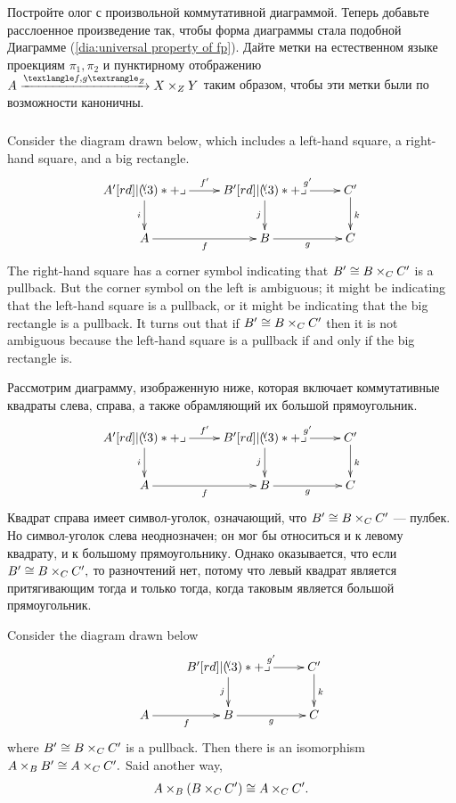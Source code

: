 \documentclass[../main/CT4S-EN-RU]{subfiles}
\begin{document}
\begin{exerciseRUS}
Постройте олог с произвольной коммутативной диаграммой. Теперь добавьте расслоенное произведение так, чтобы форма диаграммы стала подобной Диаграмме (\ref{dia:universal property of fp}). Дайте метки на естественном языке проекциям $\pi_1,\pi_2$ и пунктирному отображению $A\To{\pb{f}{g}{Z}}X\times_ZY$ таким образом, чтобы эти метки были по возможности каноничны.
\end{exerciseRUS}


\subsubsection{}

\begin{blockENG}
Consider the diagram drawn below, which includes a left-hand square, a right-hand square, and a big rectangle.
$$
\xymatrix{
A'\ar[r]^{f'}\ar[d]_i\ullimit&B'\ar[r]^{g'}\ar[d]_j\ullimit&C'\ar[d]^k\\
A\ar[r]_f&B\ar[r]_g&C}
$$
The right-hand square has a corner symbol indicating that $B'\cong B\times_CC'$ is a pullback. But the corner symbol on the left is ambiguous; it might be indicating that the left-hand square is a pullback, or it might be indicating that the big rectangle is a pullback. It turns out that if $B'\cong B\times_CC'$ then it is not ambiguous because the left-hand square is a pullback if and only if the big rectangle is.
\end{blockENG}

\begin{blockRUS}
Рассмотрим диаграмму, изображенную ниже, которая включает коммутативные квадраты слева, справа, а также обрамляющий их большой прямоугольник.
$$
\xymatrix{
A'\ar[r]^{f'}\ar[d]_i\ullimit&B'\ar[r]^{g'}\ar[d]_j\ullimit&C'\ar[d]^k\\
A\ar[r]_f&B\ar[r]_g&C}
$$
Квадрат справа имеет символ-уголок, означающий, что $B'\cong B\times_CC'$ — пулбек. Но символ-уголок слева неоднозначен; он мог бы относиться и к левому квадрату, и к большому прямоугольнику. Однако оказывается, что если $B'\cong B\times_CC',$ то разночтений нет, потому что левый квадрат является притягивающим тогда и только тогда, когда таковым является большой прямоугольник.
\end{blockRUS}

\begin{propositionENG}\label{prop:pasting}
Consider the diagram drawn below
$$
\xymatrix{
&B'\ar[r]^{g'}\ar[d]_j\ullimit&C'\ar[d]^k\\
A\ar[r]_f&B\ar[r]_g&C}
$$
where $B'\cong B\times_CC'$ is a pullback. Then there is an isomorphism $A\times_BB'\cong A\times_CC'.$ Said another way, $$A\times_B(B\times_CC')\cong A\times_CC'.$$
\end{propositionENG}
\end{document}
